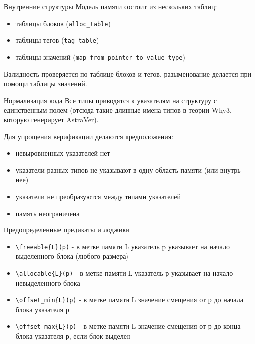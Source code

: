 \documentclass[hyperref={unicode=true}]{beamer}
\begin{document}
    \begin{frame}{Внутренние структуры}
    Модель памяти состоит из нескольких таблиц:
    \begin{itemize}
    \item таблицы блоков (\texttt{alloc\_table})
    \item таблицы тегов (\texttt{tag\_table})
    \item таблицы значений (\texttt{map from pointer to value type})
    \end{itemize}

    Валидность проверяется по таблице блоков и тегов, разыменование делается
    при помощи таблицы значений.
    \end{frame}

    \begin{frame}{Нормализация кода}
    Все типы приводятся к указателям на структуру с единственным полем (отсюда
    такие длинные имена типов в теории Why3, которую генерирует AstraVer).

    Для упрощения верификации делаются предположения:
    \begin{itemize}
    \item невыровненных указателей нет
    \item указатели разных типов не указывают в одну область памяти (или внутрь
            нее)
    \item указатели не преобразуются между типами указателей
    \item память неограничена
    \end{itemize}
    \end{frame}

    \begin{frame}{Предопределенные предикаты и лоджики}
    \begin{itemize}
    \item \texttt{\textbackslash freeable\{L\}(p)} - в метке памяти L указатель p указывает
    на начало выделенного блока (любого размера)
    \item \texttt{\textbackslash allocable\{L\}(p)} - в метке памяти L указатель р указывает
    на начало невыделенного блока
    \item \texttt{\textbackslash offset\_min\{L\}(p)} - в метке памяти L
    значение смещения от р до начала блока указателя р
    \item \texttt{\textbackslash offset\_max\{L\}(p)} - в метке памяти L
    значение смещения от р до конца блока указателя р, если блок выделен
    \end{itemize}
    \end{frame}
\end{document}
